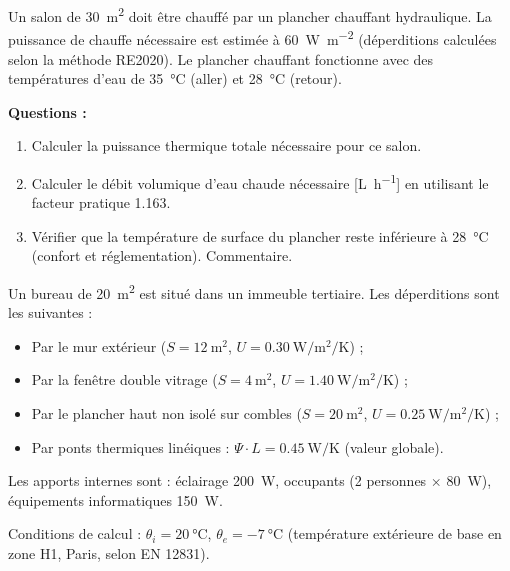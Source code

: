 

Un salon de \SI{30}{\meter\squared} doit être chauffé par un plancher chauffant hydraulique.
La puissance de chauffe nécessaire est estimée à \SI{60}{\watt\per\meter\squared} (déperditions
calculées selon la méthode RE2020). Le plancher chauffant fonctionne avec des températures
d'eau de \SI{35}{\degreeCelsius} (aller) et \SI{28}{\degreeCelsius} (retour).

\textbf{Questions :}
\begin{enumerate}
  \item Calculer la puissance thermique totale nécessaire pour ce salon.
  \item Calculer le débit volumique d'eau chaude nécessaire [\si{\liter\per\hour}] en
        utilisant le facteur pratique \num{1,163}.
  \item Vérifier que la température de surface du plancher reste inférieure à
        \SI{28}{\degreeCelsius} (confort et réglementation). Commentaire.
\end{enumerate}



Un bureau de \SI{20}{\meter\squared} est situé dans un immeuble tertiaire. Les déperditions
sont les suivantes :
\begin{itemize}
  \item Par le mur extérieur (\(S = \SI{12}{\meter\squared}\), \(U = \SI{0,30}{\watt\per\meter\squared\per\kelvin}\)) ;
  \item Par la fenêtre double vitrage (\(S = \SI{4}{\meter\squared}\), \(U = \SI{1,40}{\watt\per\meter\squared\per\kelvin}\)) ;
  \item Par le plancher haut non isolé sur combles (\(S = \SI{20}{\meter\squared}\), \(U = \SI{0,25}{\watt\per\meter\squared\per\kelvin}\)) ;
  \item Par ponts thermiques linéiques : \(\Psi \cdot L = \SI{0,45}{\watt\per\kelvin}\) (valeur globale).
\end{itemize}

Les apports internes sont : éclairage \SI{200}{\watt}, occupants (2 personnes $\times$ \SI{80}{\watt}),
équipements informatiques \SI{150}{\watt}.

Conditions de calcul : \(\theta_i = \SI{20}{\degreeCelsius}\), \(\theta_e = \SI{-7}{\degreeCelsius}\)
(température extérieure de base en zone H1, Paris, selon EN 12831).

